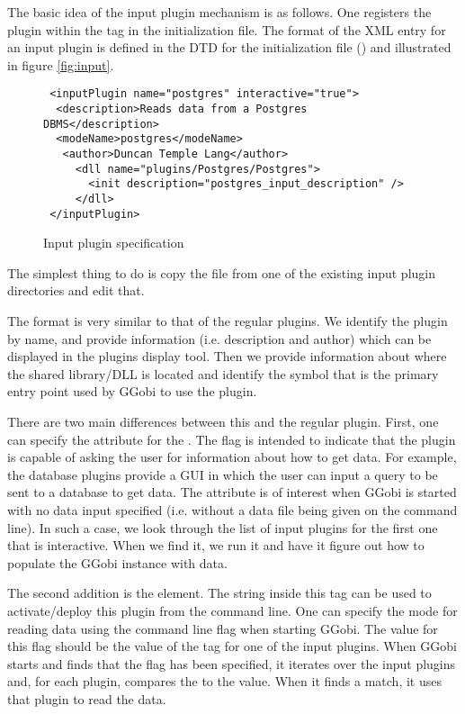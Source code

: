 \documentclass{article}
\def\file#1{\href{#1}{\Escape{#1}}}
\begin{document}
The basic idea of the input plugin mechanism is as follows.  One
registers the plugin within the  tag in the
initialization file.  The format of the XML entry for an input plugin
is defined in the DTD for the initialization file
(\file{GGobiInit.dtd}) and illustrated in figure \ref{fig:input}.

\begin{figure}[htbp]
  \begin{center}
    \leavevmode
\begin{verbatim}
 <inputPlugin name="postgres" interactive="true">
  <description>Reads data from a Postgres DBMS</description>
  <modeName>postgres</modeName>
   <author>Duncan Temple Lang</author>
     <dll name="plugins/Postgres/Postgres"> 
       <init description="postgres_input_description" />
     </dll>
 </inputPlugin>    
\end{verbatim}
    \caption{Input plugin specification}
  \end{center}
\end{figure}
The simplest thing to do is copy the \file{plugin.xml} file from one
of the existing input plugin directories and edit that.

The format is very similar to that of the regular plugins.  We
identify the plugin by name, and provide information (i.e. description
and author) which can be displayed in the plugins display tool.  Then
we provide information about where the shared library/DLL is located
and identify the symbol that is the primary entry point used by GGobi
to use the plugin.

  There are two main differences between this and the regular plugin.
First, one can specify the  attribute for
the .  The flag is intended to indicate that the
plugin is capable of asking the user for information about how to get
data. For example, the database plugins provide a GUI in which the
user can input a query to be sent to a database to get data.  The
 attribute is of interest when GGobi is
started with no data input specified (i.e. without a data file being
given on the command line).  In such a case, we look through the list
of input plugins for the first one that is interactive.  When we find
it, we run it and have it figure out how to populate the GGobi
instance with data.

The second addition is the  element.  The string
inside this tag can be used to activate/deploy this plugin from the
command line. One can specify the mode for reading data using the
command line flag  when starting GGobi.  The value for
this flag should be the value of the  tag for one of
the input plugins.  When GGobi starts and finds that the
 flag has been specified, it iterates over the input
plugins and, for each plugin, compares the  to the
 value. When it finds a match, it uses that plugin to
read the data.
\end{document}
